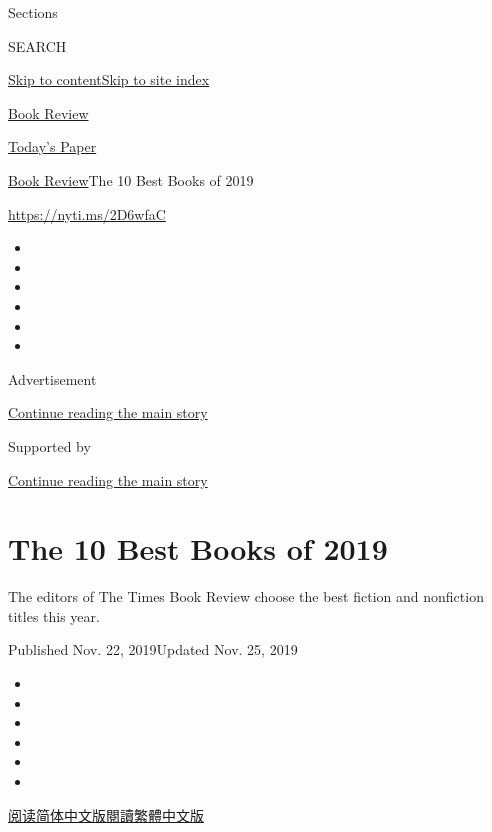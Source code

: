 Sections

SEARCH

\protect\hyperlink{site-content}{Skip to
content}\protect\hyperlink{site-index}{Skip to site index}

\href{https://www.nytimes3xbfgragh.onion/section/books/review}{Book
Review}

\href{https://myaccount.nytimes3xbfgragh.onion/auth/login?response_type=cookie\&client_id=vi}{}

\href{https://www.nytimes3xbfgragh.onion/section/todayspaper}{Today's
Paper}

\href{/section/books/review}{Book Review}\textbar{}The 10 Best Books of
2019

\url{https://nyti.ms/2D6wfaC}

\begin{itemize}
\item
\item
\item
\item
\item
\item
\end{itemize}

Advertisement

\protect\hyperlink{after-top}{Continue reading the main story}

Supported by

\protect\hyperlink{after-sponsor}{Continue reading the main story}

\hypertarget{the-10-best-books-of-2019}{%
\section{The 10 Best Books of 2019}\label{the-10-best-books-of-2019}}

The editors of The Times Book Review choose the best fiction and
nonfiction titles this year.

Published Nov. 22, 2019Updated Nov. 25, 2019

\begin{itemize}
\item
\item
\item
\item
\item
\item
\end{itemize}

\href{https://cn.nytimes3xbfgragh.onion/culture/20191127/best-books/}{阅读简体中文版}\href{https://cn.nytimes3xbfgragh.onion/culture/20191127/best-books/zh-hant/}{閱讀繁體中文版}

